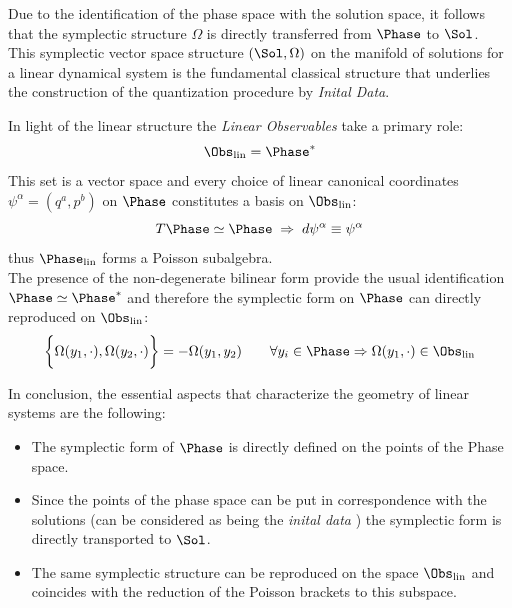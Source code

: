 \documentclass[Main]{subfiles}
\begin{document}
	Due to the identification of the phase space with the solution space, it follows that the symplectic structure $\Omega$ is directly transferred from $\Phase$ to $\Sol$.\\
	This symplectic vector space structure $( \Sol	, \Omega)$ on the manifold of solutions for a linear dynamical system is the fundamental classical structure that underlies the construction of the quantization procedure by  \emph{Inital Data}.
	
	In light of the linear structure the \emph{Linear Observables} take a primary role:
	\begin{displaymath}
		\Obs_{\textrm{lin}} = \Phase^*
	\end{displaymath}
	This set is a vector space and every choice of linear canonical coordinates $\psi^\alpha = (q^a, p^b)$ on $\Phase$ constitutes a  basis on $\Obs_{\textrm{lin}} $:
	\begin{displaymath}
		T\Phase \simeq \Phase \; \Rightarrow \; d\psi^\alpha \equiv \psi^\alpha
	\end{displaymath}
	thus $\Phase_{\textrm{lin}}$ forms a Poisson subalgebra.
	\\%
	The presence of the non-degenerate bilinear form provide the usual identification $\Phase \simeq \Phase^*$ and therefore the symplectic form on $\Phase$ can directly reproduced on $\Obs_{\textrm{lin}} $:
	\begin{displaymath}
		\biggr\{ \Omega(y_1, \cdot),\Omega(y_2, \cdot)\biggr\} = - \Omega(y_1, y_2) \qquad \forall y_i \in \Phase \Rightarrow \Omega(y_1, \cdot) \in \Obs_\textrm{lin}
	\end{displaymath}

	
	
	
			In conclusion, the essential aspects that characterize the geometry of linear systems are the following:
		\begin{itemize}
			\item The symplectic form of $\Phase$ is directly defined on the points of the Phase space.
			\item Since the points of the phase space can be put in correspondence with the solutions (can be considered as being  the \emph{inital data} ) the symplectic form is directly transported to $\Sol$.
			\item The same symplectic structure can be reproduced on the space $\Obs_\textrm{lin}$ and coincides with the reduction of the Poisson brackets to this subspace.
			\end{itemize}
\end{document}
